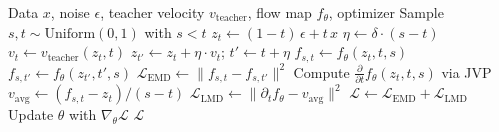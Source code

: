 \begin{algorithm}[t]
\caption{Align Your Flow (AYF) Distillation}
\label{alg:align_your_flow}
\begin{algorithmic}[1]
\Require Data $x$, noise $\epsilon$, teacher velocity $v_{\text{teacher}}$, flow map $f_\theta$, optimizer
\State Sample $s, t \sim \text{Uniform}(0,1)$ with $s < t$
\State $z_t \gets (1 - t) \, \epsilon + t \, x$
\State $\eta \gets \delta \cdot (s - t)$ 
\State $v_t \gets v_{\text{teacher}}(z_t, t)$
\State $z_{t'} \gets z_t + \eta \cdot v_t$; \quad $t' \gets t + \eta$ 
\State $f_{s,t} \gets f_\theta(z_t, t, s)$
\State $f_{s,t'} \gets f_\theta(z_{t'}, t', s)$
\State $\mathcal{L}_{\text{EMD}} \gets \| f_{s,t} - f_{s,t'} \|^2$ 
\State Compute $\frac{\partial}{\partial t} f_\theta(z_t, t, s)$ via JVP
\State $v_{\text{avg}} \gets (f_{s,t} - z_t) / (s - t)$
\State $\mathcal{L}_{\text{LMD}} \gets \| \partial_t f_\theta - v_{\text{avg}} \|^2$ 
\State $\mathcal{L} \gets \mathcal{L}_{\text{EMD}} + \mathcal{L}_{\text{LMD}}$
\State Update $\theta$ with $\nabla_\theta \mathcal{L}$
\State \Return $\mathcal{L}$
\end{algorithmic}
\end{algorithm}
